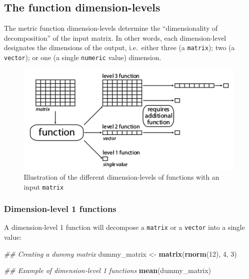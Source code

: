 \documentclass[
]{book}
\newenvironment{Shaded}{\begin{snugshade}}{\end{snugshade}}
\newcommand{\CommentTok}[1]{\textcolor[rgb]{0.56,0.35,0.01}{\textit{#1}}}
\newcommand{\DecValTok}[1]{\textcolor[rgb]{0.00,0.00,0.81}{#1}}
\newcommand{\KeywordTok}[1]{\textcolor[rgb]{0.13,0.29,0.53}{\textbf{#1}}}
\newcommand{\NormalTok}[1]{#1}
\newcommand{\StringTok}[1]{\textcolor[rgb]{0.31,0.60,0.02}{#1}}
\begin{document}
\hypertarget{the-function-dimension-levels}{%
\subsection{The function dimension-levels}\label{the-function-dimension-levels}}

The metric function dimension-levels determine the ``dimensionality of decomposition'' of the input matrix.
In other words, each dimension-level designates the dimensions of the output, i.e.~either three (a \texttt{matrix}); two (a \texttt{vector}); or one (a single \texttt{numeric} value) dimension.

\begin{figure}
\centering
\includegraphics{dispRity_fun.png}
\caption{Illustration of the different dimension-levels of functions with an input \texttt{matrix}}
\end{figure}

\hypertarget{dimension-level-1-functions}{%
\subsubsection{Dimension-level 1 functions}\label{dimension-level-1-functions}}

A dimension-level 1 function will decompose a \texttt{matrix} or a \texttt{vector} into a single value:

\begin{Shaded}
\begin{Highlighting}[]
\CommentTok{\#\# Creating a dummy matrix}
\NormalTok{dummy\_matrix \textless{}{-}}\StringTok{ }\KeywordTok{matrix}\NormalTok{(}\KeywordTok{rnorm}\NormalTok{(}\DecValTok{12}\NormalTok{), }\DecValTok{4}\NormalTok{, }\DecValTok{3}\NormalTok{)}

\CommentTok{\#\# Example of dimension{-}level 1 functions}
\KeywordTok{mean}\NormalTok{(dummy\_matrix)}
\end{Highlighting}
\end{Shaded}
\end{document}
